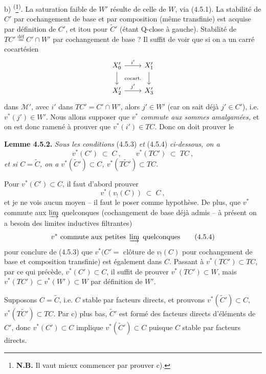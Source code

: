 \documentclass[11pt]{article}
\newcommand{\printedpage}[1]{\marginpar{\footnotesize p.~#1}}
\newcommand{\msp}[1]{\marginpar{\footnotesize [#1]}}
\newcommand{\defeq}{\overset{\text{déf}}{=}}
\begin{document}
b) \textsuperscript{(}\footnote[19]{\textbf{N.B.} Il vaut mieux commencer par prouver c).}\textsuperscript{)}. La saturation faible de $W'$ résulte de celle de $W$, via (4.5.1). La stabilité de $C'$ par cochangement de base et par composition (même transfinie) est acquise par définition de $C'$, et itou pour $\tilde{C}'$ (étant Q-close à gauche). Stabilité de $TC' \defeq C'{\cap}W'$ par cochangement de base ? Il suffit de voir que si on a un carré cocartésien
\[
\begin{tikzcd}
X'_0 \arrow[r, "i'"] \arrow[d] \arrow[dr, phantom, "\text{\scriptsize cocart.}"] & X'_1 \arrow[d] \\
X'_2 \arrow[r, "j'"] & X'_3
\end{tikzcd}
\]
dans $\mathcal{M}'$, avec $i'$ dans $TC' = C' \cap W'$, alors $j' \in W'$ (car on sait déjà $j' \in C'$), i.e.
\marginpar{$||$}%
$v^*(j') \in W'$. Nous allons supposer que $v^*$ \textit{commute aux sommes amalgamées,} et on est donc ramené à prouver que $v^*(i') \in TC$. Donc %
\printedpage{37}
\msp{page 76}
on doit prouver le

\textbf{Lemme 4.5.2.} \textit{Sous les conditions} (4.5.3) \textit{et} (4.5.4) \textit{ci-dessous, on a}
\[
v^*(C') \;\subset\; C\ , \qquad v^*(TC') \;\subset\; TC\ ,
\]
\textit{et si $C = \tilde{C}$, on a $v^*(\tilde{C}') \subset C$, $v^*(T\tilde{C}') \subset TC$.}

Pour $v^*(C') \subset C$, il faut d'abord prouver
\[
v^*(v_!(C)) \;\subset\; C\ , \tag*{(4.5.3)}
\]
et je ne vois aucun moyen -- il faut le poser comme hypothèse. De plus, que $v^*$ commute aux $\varinjlim$ quelconques (cochangement de base déjà admis -- à présent on a besoin des limites inductives filtrantes)
\[
v^* \text{ commute aux petites } \varinjlim \text{ quelconques} \tag*{(4.5.4)}
\]
pour conclure de (4.5.3) que $v^*(C' =$ clôture de $v_!(C)$ pour cochangement de base et composition transfinie) est également dans $C$. Passant à $v^*(TC') \subset TC$, par ce qui précède, $v^*(C') \subset C$, il suffit de prouver $v^*(TC') \subset W$, mais $v^*(TC') \subset v^*(W') \subset W$ par définition de $W'$.

Supposons $C = \tilde{C}$, i.e. $C$ stable par facteurs directs, et prouvons $v^*(\tilde{C}') \subset C$, $v^*(T\tilde{C}') \subset TC$. Par c) plus bas, $\tilde{C}'$ est formé des facteurs directs
\msp{page 77}
d'éléments de $C'$, donc $v^*(C') \subset C$ implique $v^*(\tilde{C}') \subset C$ puisque $C$ stable par facteurs directs.
\end{document}
